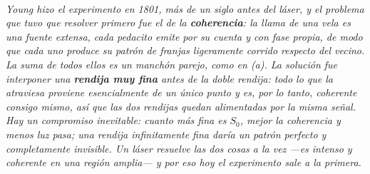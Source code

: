 \begin{center}
\\[0.5em]
{\small\itshape Young hizo el experimento en 1801, más de un siglo antes del
láser, y el problema que tuvo que resolver primero fue el de la
\textbf{coherencia}: la llama de una vela es una fuente extensa, cada pedacito
emite por su cuenta y con fase propia, de modo que cada uno produce su patrón de
franjas ligeramente corrido respecto del vecino. La suma de todos ellos es un
manchón parejo, como en (a). La solución fue interponer una \textbf{rendija muy
fina} antes de la doble rendija: todo lo que la atraviesa proviene
esencialmente de un único punto y es, por lo tanto, coherente consigo mismo, así
que las dos rendijas quedan alimentadas por la misma señal. Hay un compromiso
inevitable: cuanto más fina es $S_0$, mejor la coherencia y menos luz pasa; una
rendija infinitamente fina daría un patrón perfecto y completamente invisible.
Un láser resuelve las dos cosas a la vez ---es intenso y coherente en una región
amplia--- y por eso hoy el experimento sale a la primera.}
\end{center}
